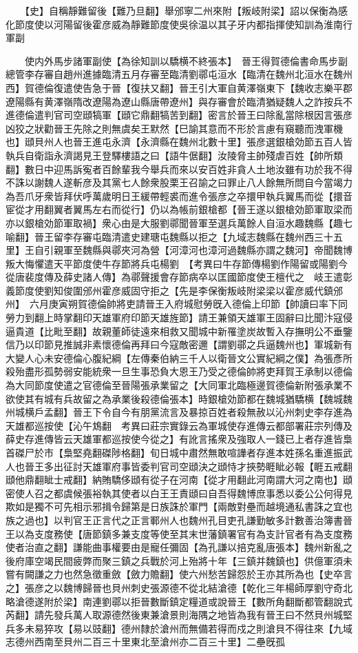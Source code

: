 　　【史】自稱靜難留後【難乃旦翻】舉邠寧二州來附【叛岐附梁】詔以保衡為感化節度使以河陽留後霍彦威為靜難節度使吳徐温以其子牙内都指揮使知訓為淮南行軍副

　　使内外馬步諸軍副使【為徐知訓以驕横不終張本】　晉王得賀德倫書命馬步副總管李存審自趙州進據臨清五月存審至臨清劉鄩屯洹水【臨清在魏州北洹水在魏州西】賀德倫復遣使告急于晉【復扶又翻】晉王引大軍自黄澤嶺東下【魏收志樂平郡遼陽縣有黄澤嶺隋改遼陽為遼山縣唐帶遼州】與存審會於臨清猶疑魏人之詐按兵不進德倫遣判官司空頲犒軍【頲它鼎翻犒苦到翻】密言於晉王曰除亂當除根因言張彦凶狡之狀勸晉王先除之則無虞矣王默然【巳諭其意而不形於言慮有窺聽而洩軍機也】頲貝州人也晉王進屯永濟【永濟縣在魏州北數十里】張彦選銀槍効節五百人皆執兵自衛詣永濟謁見王登驛樓語之曰【語牛倨翻】汝陵脅主帥殘虐百姓【帥所類翻】數日中迎馬訴寃者百餘輩我今舉兵而來以安百姓非貪人土地汝雖有功於我不得不誅以謝魏人遂斬彦及其黨七人餘衆股栗王召諭之曰罪止八人餘無所問自今當竭力為吾爪牙衆皆拜伏呼萬歲明日王緩帶輕裘而進令張彦之卒擐甲執兵翼馬而從【擐音宦從才用翻翼者翼馬左右而從行】仍以為帳前銀槍都【晉王遂以銀槍効節軍取梁而亦以銀槍効節軍取禍】衆心由是大服劉鄩聞晉軍至選兵萬餘人自洹水趣魏縣【趣七喻翻】晉王留李存審屯臨清遣史建瑭屯魏縣以拒之【九域志魏縣在魏州西三十五里】王自引親軍至魏縣與鄩夾河為營【河漳河也漳河過魏縣亦謂之魏河】帝聞魏博叛大悔懼遣天平節度使牛存節將兵屯楊劉　【考異曰牛存節傳楊劉作陽留或陽劉今從唐裴度傳及薛史諸人傳】為鄩聲援會存節病卒以匡國節度使王檀代之　岐王遣彰義節度使劉知俊圍邠州霍彦威固守拒之【先是李保衡叛岐附梁梁以霍彦威代鎮邠州】　六月庚寅朔賀德倫帥將吏請晉王入府城慰勞旣入德倫上印節【帥讀曰率下同勞力到翻上時掌翻印天雄軍府印節天雄旌節】請王兼領天雄軍王固辭曰比聞汴寇侵逼貴道【比毗至翻】故親董師徒遠來相救又聞城中新罹塗炭故暫入存撫明公不垂鑒信乃以印節見推誠非素懷德倫再拜曰今寇敵密邇【謂劉鄩之兵逼魏州也】軍城新有大變人心未安德倫心腹紀綱【左傳秦伯納三千人以衛晉文公實紀綱之僕】為張彥所殺殆盡形孤勢弱安能統衆一旦生事恐負大恩王乃受之德倫帥將吏拜賀王承制以德倫為大同節度使遣之官德倫至晉陽張承業留之【大同軍北臨極邊賀德倫新附張承業不欲使其有城有兵故留之為承業後殺德倫張本】時銀槍効節都在魏城猶驕横【魏城魏州城横戶孟翻】晉王下令自今有朋黨流言及暴掠百姓者殺無赦以沁州刺史李存進為天雄都巡按使【沁午鴆翻　考異曰莊宗實錄云為軍城使存進傳云都部署莊宗列傳及薛史存進傳皆云天雄軍都巡按使今從之】有訛言搖衆及強取人一錢已上者存進皆梟首磔尸於市【梟堅堯翻磔陟格翻】旬日城中肅然無敢喧譁者存進本姓孫名重進振武人也晉王多出征討天雄軍府事皆委判官司空頲決之頲恃才挾勢睚眦必報【睚五戒翻頲他鼎翻眦士戒翻】納賄驕侈頲有從子在河南【從才用翻此河南謂大河之南也】頲密使人召之都虞候張裕執其使者以白王王責頲曰自吾得魏博庶事悉以委公公何得見欺如是獨不可先相示邪揖令歸第是日族誅於軍門【兩敵對壘而越境通私書誅之宜也族之過也】以判官王正言代之正言鄆州人也魏州孔目吏孔謙勤敏多計數善治簿書晉王以為支度務使【唐節鎮多兼支度等使至其末世藩鎮署官有為支計官者有為支度務使者治直之翻】謙能曲事權要由是寵任彌固【為孔謙以掊克亂唐張本】魏州新亂之後府庫空竭民間疲弊而聚三鎮之兵戰於河上殆將十年【三鎮并魏鎮也】供億軍須未嘗有闕謙之力也然急徵重斂【斂力贍翻】使六州愁苦歸怨於王亦其所為也【史卒言之】張彦之以魏博歸晉也貝州刺史張源德不從北結滄德【乾化三年楊師厚劉守奇北略滄德遂附於梁】南連劉鄩以拒晉數斷鎮定糧道或說晉王【數所角翻斷都管翻說式芮翻】請先發兵萬人取源德然後東兼滄景則海隅之地皆為我有晉王曰不然貝州城堅兵多未易猝攻【易以豉翻】德州隸於滄州而無備若得而戍之則滄貝不得往來【九域志德州西南至貝州二百三十里東北至滄州亦二百三十里】二壘旣孤